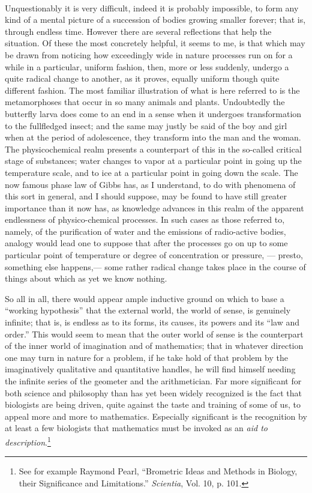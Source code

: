 \documentclass[a4paper, 11pt, oneside, polutonikogreek, english]{article}
\begin{document}
\paragraph{}
Unquestionably it is very difficult, indeed it is probably impossible, to form any kind of a mental picture of a succession of bodies growing smaller forever; that is, through endless time. However there are several reflections that help the situation. Of these the most concretely helpful, it seems to me, is that which may be drawn from noticing how exceedingly wide in nature processes run on for a while in a particular, uniform fashion, then, more or less suddenly, undergo a quite radical change to another, as it proves, equally uniform though quite different fashion. The most familiar illustration of what is here referred to is the metamorphoses that occur in so many animals and plants. Undoubtedly the butterfly larva does come to an end in a sense when it undergoes transformation to the fullfledged insect; and the same may justly be said of the boy and girl when at the period of adolescence, they transform into the man and the woman. The physicochemical realm presents a counterpart of this in the so-called critical stage of substances; water changes to vapor at a particular point in going up the temperature scale, and to ice at a particular point in going down the scale. The now famous phase law of Gibbs has, as I understand, to do with phenomena of this sort in general, and I should suppose, may be found to have still greater importance than it now has, as knowledge advances in this realm of the apparent endlessness of physico-chemical processes. In such cases as those referred to, namely, of the purification of water and the emissions of radio-active bodies, analogy would lead one to suppose that after the processes go on up to some particular point of temperature or degree of concentration or pressure, --- presto, something else happens,--- some rather radical change takes place in the course of things about which as yet we know nothing.

So all in all, there would appear ample inductive ground on which to base a ``working hypothesis'' that the external world, the world of sense, is genuinely infinite; that is, is endless as to its forms, its causes, its powers and its ``law and order.'' This would seem to mean that the outer world of sense is the counterpart of the inner world of imagination and of mathematics; that in whatever direction one may turn in nature for a problem, if he take hold of that problem by the imaginatively qualitative and quantitative handles, he will find himself needing the infinite series of the geometer and the arithmetician. Far more significant for both science and philosophy than has yet been widely recognized is the fact that biologists are being driven, quite against the taste and training of some of us, to appeal more and more to mathematics. Especially significant is the recognition by at least a few biologists that mathematics must be invoked as an \emph{aid to description}.\footnote{See for example Raymond Pearl, ``Brometric Ideas and Methods in Biology, their Significance and Limitations.'' \emph{Scientia}, Vol. 10, p. 101.}
\end{document}
